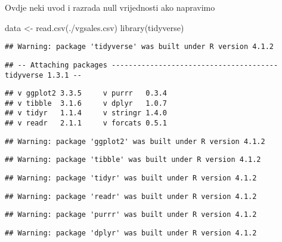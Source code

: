 \documentclass[
]{article}
\author{}
\date{\vspace{-2.5em}}
\newenvironment{Shaded}{\begin{snugshade}}{\end{snugshade}}
\newcommand{\FunctionTok}[1]{\textcolor[rgb]{0.00,0.00,0.00}{#1}}
\newcommand{\NormalTok}[1]{#1}
\newcommand{\OtherTok}[1]{\textcolor[rgb]{0.56,0.35,0.01}{#1}}
\newcommand{\StringTok}[1]{\textcolor[rgb]{0.31,0.60,0.02}{#1}}
\begin{document}
Ovdje neki uvod i razrada null vrijednosti ako napravimo

\begin{Shaded}
\begin{Highlighting}[]
\NormalTok{data }\OtherTok{\textless{}{-}} \FunctionTok{read.csv}\NormalTok{(}\StringTok{\textquotesingle{}./vgsales.csv\textquotesingle{}}\NormalTok{)}
\FunctionTok{library}\NormalTok{(tidyverse)}
\end{Highlighting}
\end{Shaded}

\begin{verbatim}
## Warning: package 'tidyverse' was built under R version 4.1.2
\end{verbatim}

\begin{verbatim}
## -- Attaching packages --------------------------------------- tidyverse 1.3.1 --
\end{verbatim}

\begin{verbatim}
## v ggplot2 3.3.5     v purrr   0.3.4
## v tibble  3.1.6     v dplyr   1.0.7
## v tidyr   1.1.4     v stringr 1.4.0
## v readr   2.1.1     v forcats 0.5.1
\end{verbatim}

\begin{verbatim}
## Warning: package 'ggplot2' was built under R version 4.1.2
\end{verbatim}

\begin{verbatim}
## Warning: package 'tibble' was built under R version 4.1.2
\end{verbatim}

\begin{verbatim}
## Warning: package 'tidyr' was built under R version 4.1.2
\end{verbatim}

\begin{verbatim}
## Warning: package 'readr' was built under R version 4.1.2
\end{verbatim}

\begin{verbatim}
## Warning: package 'purrr' was built under R version 4.1.2
\end{verbatim}

\begin{verbatim}
## Warning: package 'dplyr' was built under R version 4.1.2
\end{verbatim}
\end{document}
